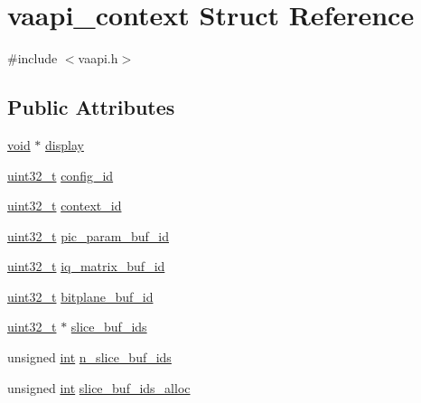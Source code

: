 \hypertarget{structvaapi__context}{}\section{vaapi\+\_\+context Struct Reference}
\label{structvaapi__context}


{\ttfamily \#include $<$vaapi.\+h$>$}

\subsection*{Public Attributes}
\begin{DoxyCompactItemize}
\item 
\hyperlink{sound_8c_ae35f5844602719cf66324f4de2a658b3}{void} $\ast$ \hyperlink{structvaapi__context_ad16240a71f568ffdb98dc7cc7d231180}{display}
\item 
\hyperlink{lib-src_2ffmpeg_2win32_2stdint_8h_a6eb1e68cc391dd753bc8ce896dbb8315}{uint32\+\_\+t} \hyperlink{structvaapi__context_a8523abca4746125bb1458a13bee1a1bd}{config\+\_\+id}
\item 
\hyperlink{lib-src_2ffmpeg_2win32_2stdint_8h_a6eb1e68cc391dd753bc8ce896dbb8315}{uint32\+\_\+t} \hyperlink{structvaapi__context_a2574735bdd4c51910ce627a6f1ec0b63}{context\+\_\+id}
\item 
\hyperlink{lib-src_2ffmpeg_2win32_2stdint_8h_a6eb1e68cc391dd753bc8ce896dbb8315}{uint32\+\_\+t} \hyperlink{structvaapi__context_ad674d4caefd1f4a1de37e5c05e595194}{pic\+\_\+param\+\_\+buf\+\_\+id}
\item 
\hyperlink{lib-src_2ffmpeg_2win32_2stdint_8h_a6eb1e68cc391dd753bc8ce896dbb8315}{uint32\+\_\+t} \hyperlink{structvaapi__context_a0182841a5d2ad71f35257f97eb9a2ebc}{iq\+\_\+matrix\+\_\+buf\+\_\+id}
\item 
\hyperlink{lib-src_2ffmpeg_2win32_2stdint_8h_a6eb1e68cc391dd753bc8ce896dbb8315}{uint32\+\_\+t} \hyperlink{structvaapi__context_a94c78d1c8fffa43a4d816b1a5182e31c}{bitplane\+\_\+buf\+\_\+id}
\item 
\hyperlink{lib-src_2ffmpeg_2win32_2stdint_8h_a6eb1e68cc391dd753bc8ce896dbb8315}{uint32\+\_\+t} $\ast$ \hyperlink{structvaapi__context_adc452028b6218a76c8ec270f8311b15f}{slice\+\_\+buf\+\_\+ids}
\item 
unsigned \hyperlink{xmltok_8h_a5a0d4a5641ce434f1d23533f2b2e6653}{int} \hyperlink{structvaapi__context_aee70c2c0dab6a499d2692e46fc0c0cca}{n\+\_\+slice\+\_\+buf\+\_\+ids}
\item 
unsigned \hyperlink{xmltok_8h_a5a0d4a5641ce434f1d23533f2b2e6653}{int} \hyperlink{structvaapi__context_a4eb08e120d10e1ca3f0692cf9eba826a}{slice\+\_\+buf\+\_\+ids\+\_\+alloc}

\end{DoxyCompactItemize}
